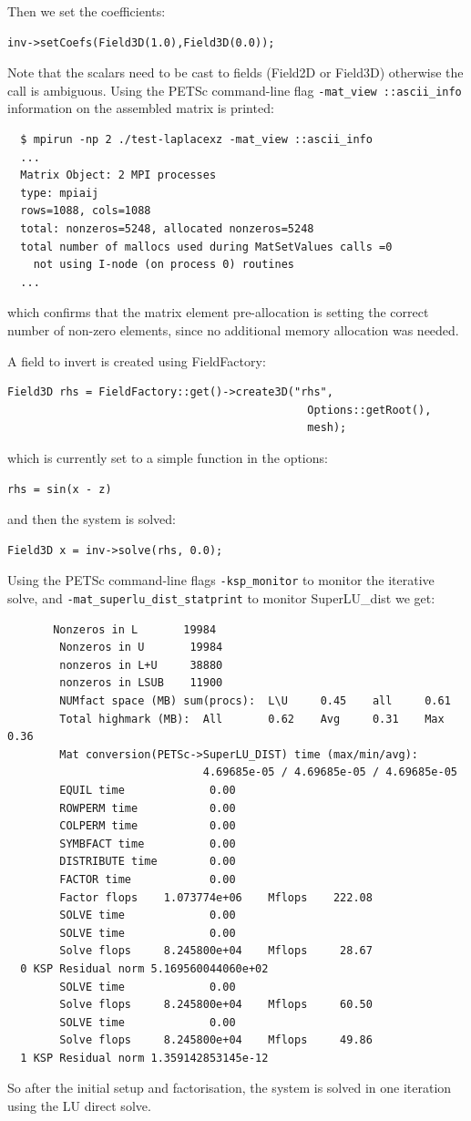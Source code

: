 \documentclass[12pt]{article}
\begin{document}
Then we set the coefficients:
%
\begin{lstlisting}[numbers=none]
  inv->setCoefs(Field3D(1.0),Field3D(0.0));
\end{lstlisting}
%
Note that the scalars need to be cast to fields (Field2D or Field3D) otherwise
the call is ambiguous. Using the PETSc command-line flag \texttt{-mat\_view
::ascii\_info} information on the assembled matrix is printed:
%
\begin{verbatim}
  $ mpirun -np 2 ./test-laplacexz -mat_view ::ascii_info
  ...
  Matrix Object: 2 MPI processes
  type: mpiaij
  rows=1088, cols=1088
  total: nonzeros=5248, allocated nonzeros=5248
  total number of mallocs used during MatSetValues calls =0
    not using I-node (on process 0) routines
  ...
\end{verbatim}
%
which confirms that the matrix element pre-allocation is setting the correct
number of non-zero elements, since no additional memory allocation was needed.

A field to invert is created using FieldFactory:
%
\begin{lstlisting}[numbers=none]
  Field3D rhs = FieldFactory::get()->create3D("rhs",
                                              Options::getRoot(),
                                              mesh);
\end{lstlisting}
%
which is currently set to a simple function in the options:
%
\begin{lstlisting}[numbers=none]
  rhs = sin(x - z)
\end{lstlisting}
%
and then the system is solved:
%
\begin{lstlisting}[numbers=none]
  Field3D x = inv->solve(rhs, 0.0);
\end{lstlisting}
%
Using the PETSc command-line flags \texttt{-ksp\_monitor} to monitor the
iterative solve, and \texttt{-mat\_superlu\_dist\_statprint} to monitor
SuperLU\_dist we get:
%
\begin{verbatim}
       Nonzeros in L       19984
        Nonzeros in U       19984
        nonzeros in L+U     38880
        nonzeros in LSUB    11900
        NUMfact space (MB) sum(procs):  L\U     0.45    all     0.61
        Total highmark (MB):  All       0.62    Avg     0.31    Max     0.36
        Mat conversion(PETSc->SuperLU_DIST) time (max/min/avg):
                              4.69685e-05 / 4.69685e-05 / 4.69685e-05
        EQUIL time             0.00
        ROWPERM time           0.00
        COLPERM time           0.00
        SYMBFACT time          0.00
        DISTRIBUTE time        0.00
        FACTOR time            0.00
        Factor flops    1.073774e+06    Mflops    222.08
        SOLVE time             0.00
        SOLVE time             0.00
        Solve flops     8.245800e+04    Mflops     28.67
  0 KSP Residual norm 5.169560044060e+02
        SOLVE time             0.00
        Solve flops     8.245800e+04    Mflops     60.50
        SOLVE time             0.00
        Solve flops     8.245800e+04    Mflops     49.86
  1 KSP Residual norm 1.359142853145e-12
\end{verbatim}
%
So after the initial setup and factorisation, the system is solved in one
iteration using the LU direct solve.
\end{document}
